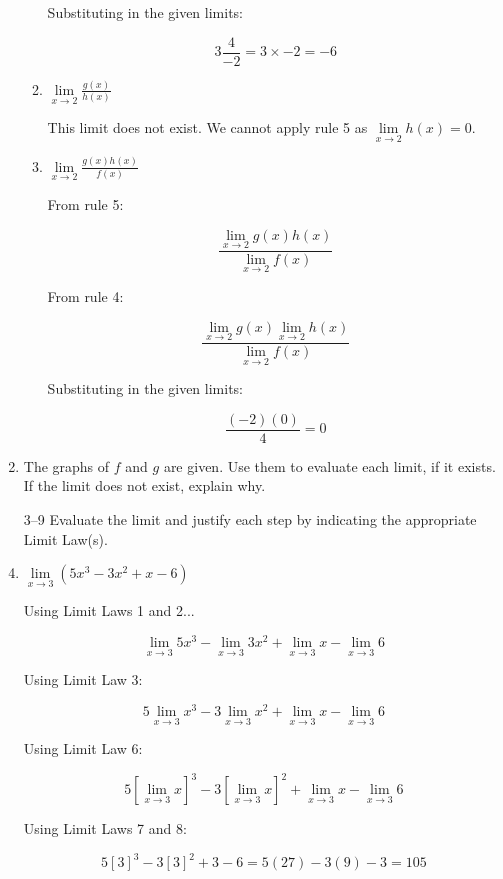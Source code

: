 \documentclass{article}
\begin{document}
\begin{enumerate}
\begin{enumerate}
				Substituting in the given limits:
				
				$$ 3 \frac{4}{-2} = 3 \times -2 = -6$$
				
			\item $\lim \limits _{x \to 2} \frac{g(x)}{h(x)}$
			
				This limit does not exist. We cannot apply rule 5 as $\lim \limits _{x \to 2} h(x) = 0$.
				
			\item $\lim \limits _{x \to 2} \frac{g(x)h(x)}{f(x)}$
			
				From rule 5:
			
				$$ \frac{\lim \limits _{x \to 2} g(x)h(x)}{\lim \limits _{x \to 2} f(x)}$$
				
				From rule 4:
				
				$$ \frac{\lim \limits _{x \to 2} g(x) \lim \limits _{x \to 2} h(x)}{\lim \limits _{x \to 2} f(x)}$$
				
				Substituting in the given limits:
				
				$$\frac{(-2)(0)}{4} = 0$$
		\end{enumerate}
		
		\item The graphs of $f$ and $g$ are given. Use them to evaluate each limit, if it exists. If the limit
			does not exist, explain why.
			
		\item[3--9] Evaluate the limit and justify each step by indicating the appropriate Limit Law(s).
		
		\item $\lim \limits _{x \to 3} (5x^3 - 3x^2 + x - 6)$
		
			Using Limit Laws 1 and 2...
			
			$$\lim \limits _{x \to 3} 5x^3 - \lim \limits _{x \to 3} 3x^2 + \lim \limits _{x \to 3} x - \lim \limits _{x \to 3} 6$$
			
			Using Limit Law 3:
			
			$$5\lim \limits _{x \to 3} x^3 - 3 \lim \limits _{x \to 3} x^2 + \lim \limits _{x \to 3} x - \lim \limits _{x \to 3} 6$$
			
			Using Limit Law 6:
			
			$$5[\lim \limits _{x \to 3} x]^3 - 3 [\lim \limits _{x \to 3} x]^2 + \lim \limits _{x \to 3} x - \lim \limits _{x \to 3} 6$$
			
			Using Limit Laws 7 and 8:
			
			$$5[3]^3 - 3 [3]^2 + 3 -  6 = 5(27) - 3(9) - 3 = 105$$			
			

\end{enumerate}
\end{document}
